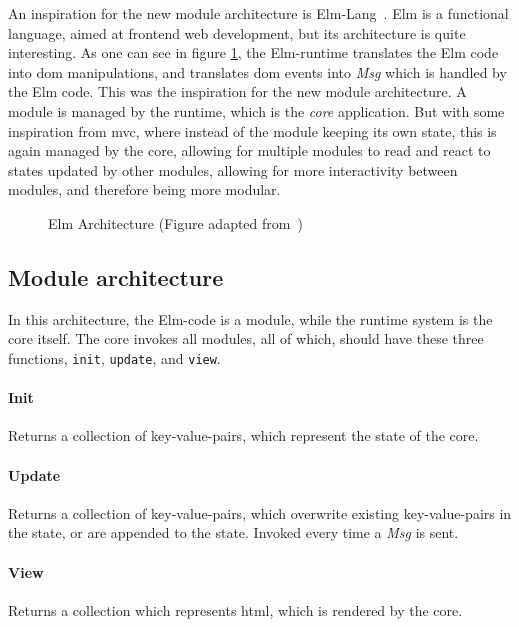 An inspiration for the new module architecture is Elm-Lang~\cite{elmLang}. Elm
is a functional language, aimed at frontend web development, but its
architecture is quite interesting. As one can see in figure
\ref{fig:elmArchitecture}, the Elm-runtime translates the Elm code into
\gls*{dom} manipulations, and translates \gls*{dom} events into \textit{Msg}
which is handled by the Elm code. This was the inspiration for the new module
architecture. A module is managed by the runtime, which is the \textit{core}
application. But with some inspiration from \gls*{mvc}, where instead of the
module keeping its own state, this is again managed by the core, allowing for
multiple modules to read and react to states updated by other modules, allowing
for more interactivity between modules, and therefore being more modular.

\begin{figure}[H]
  \centering
  
  \caption{Elm Architecture (Figure adapted from~\cite{elmFig})}
  \label{fig:elmArchitecture}
\end{figure}

\subsection{Module architecture}

In this architecture, the Elm-code is a module, while the runtime system is the
core itself. The core invokes all modules, all of which, should have these three
functions, \lstinline{init}, \lstinline{update}, and \lstinline{view}.

\paragraph{Init} Returns a collection of key-value-pairs, which represent
the state of the core.

\paragraph{Update} Returns a collection of key-value-pairs, which
overwrite existing key-value-pairs in the state, or are appended to the state.
Invoked every time a \textit{Msg} is sent.

\paragraph{View} Returns a collection which represents \gls*{html},
which is rendered by the core.

